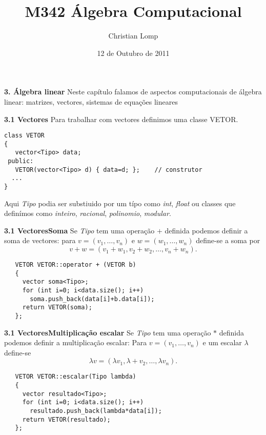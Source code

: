 \documentclass{beamer}
\title[M342]{M342 Álgebra Computacional}
\author{Christian Lomp}
\institute{FCUP}
\date{12 de Outubro de 2011}
\begin{document}
\begin{frame}
\titlepage
\end{frame}







\begin{frame}{\bf 3. Álgebra linear }
Neste capítulo falamos de aspectos computacionais de álgebra linear: matrizes, vectores, sistemas de equações lineares
\end{frame}

\begin{frame}[fragile]{\bf 3.1 Vectores}
Para trabalhar com vectores definimos uma classe VETOR.

\lstset{language=C++}
\begin{lstlisting}
class VETOR
{
   vector<Tipo> data;
 public:
   VETOR(vector<Tipo> d) { data=d; };    // construtor
  ...
}
\end{lstlisting}

Aqui {\it Tipo} podia ser substiuido por um típo como {\it int}, {\it float} ou classes que definímos como {\it inteiro}, {\it racional}, {\it polinomio}, {\it modular}.

\end{frame}

\begin{frame}[fragile]{\bf 3.1 Vectores}{\bf Soma}
Se {\it Tipo} tem uma operação $+$ definida podemos definir a soma de vectores:
para $v=(v_1,\ldots, v_n)$ e $w=(w_1,\ldots, w_n)$ define-se a soma por
$$ v + w = (v_1+w_1, v_2+w_2, \ldots, v_n+w_n).$$
\lstset{language=C++}
\begin{lstlisting}
   VETOR VETOR::operator + (VETOR b)
   {
     vector soma<Tipo>;                 
     for (int i=0; i<data.size(); i++)  
       soma.push_back(data[i]+b.data[i]);
     return VETOR(soma);
   };
\end{lstlisting}
\end{frame}

\begin{frame}[fragile]{\bf 3.1 Vectores}{\bf Multiplicação escalar}
Se {\it Tipo} tem uma operação $*$ definida podemos definir a multiplicação escalar:
Para $v=(v_1,\ldots, v_n)$ e um escalar $\lambda$ define-se 
$$ \lambda v = (\lambda v_1, \lambda +v_2,  \ldots, \lambda v_n).$$
\lstset{language=C++}
\begin{lstlisting}
   VETOR VETOR::escalar(Tipo lambda) 
   {
     vector resultado<Tipo>;            
     for (int i=0; i<data.size(); i++)
       resultado.push_back(lambda*data[i]);
     return VETOR(resultado);
   };
\end{lstlisting}
\end{frame}
\end{document}
